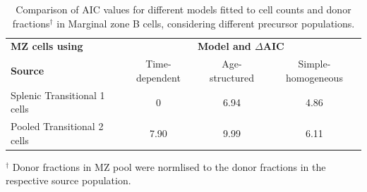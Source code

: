 \documentclass[11pt]{article}
\begin{document}
\begin{table}[h!]
	\begin{center}
		\renewcommand{\arraystretch}{1.25}
		\begin{tabular}{ l c c c } 
			\toprule 
			\multicolumn{1}{l}{\textbf{MZ cells using}} & \multicolumn{3}{c}{\textbf{Model and $\Delta$AIC}} \\
			\cline{2-4}
			\textbf{Source}  &  {\small Time-dependent}  &  {\small Age-structured} & {\small Simple-homogeneous} \\ 
			\toprule
			Splenic Transitional 1 cells      & 0      &  6.94   & 4.86  \\ 
			Pooled Transitional 2 cells       & 7.90   &  9.99   & 6.11  \\
			\hline
			\toprule 
		\end{tabular}
	\end{center}
	\caption{\small Comparison of AIC values for different models fitted to cell counts and donor fractions$^{\dagger}$ in Marginal zone B cells, considering different precursor populations. }
	$^{\dagger}$ \footnotesize{Donor fractions in MZ pool were normlised to the donor fractions in the respective source population. }
	\label{tab:MZ-AICs}
\end{table} 





\clearpage
\end{document}
